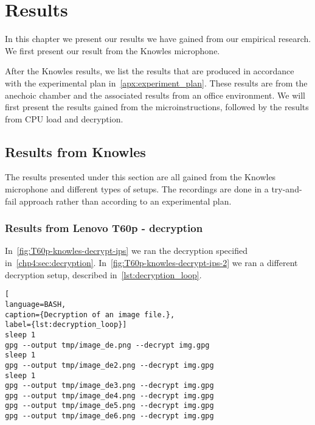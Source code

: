 \chapter{Results}
\label{chp5:results} 
In this chapter we present our results we have gained from our empirical research. 
We first present our result from the Knowles microphone.

After the Knowles results, we list the results that are produced in accordance with the experimental plan in~\autoref{apx:experiment_plan}. 
These results are from the anechoic chamber and the associated results from an office environment.  
We will first present the results gained from the microinstructions, followed by the results from CPU load and decryption. 

\section{Results from Knowles}\label{chp5:sec:knowles_results}
The results presented under this section are all gained from the Knowles microphone and different types of setups.
The recordings are done in a try-and-fail approach rather than according to an experimental plan.

\subsection{Results from Lenovo T60p - decryption}\label{chp5:subsec:t60p_knowles_results_decryption}
In~\autoref{fig:T60p-knowles-decrypt-ips} we ran the decryption specified in~\autoref{chp4:sec:decryption}. 
In~\autoref{fig:T60p-knowles-decrypt-ips-2} we ran a different decryption setup, described in~\autoref{lst:decryption_loop}.

\begin{lstlisting}[
language=BASH, 
caption={Decryption of an image file.}, 
label={lst:decryption_loop}]
sleep 1             
gpg --output tmp/image_de.png --decrypt img.gpg
sleep 1
gpg --output tmp/image_de2.png --decrypt img.gpg
sleep 1
gpg --output tmp/image_de3.png --decrypt img.gpg
gpg --output tmp/image_de4.png --decrypt img.gpg    
gpg --output tmp/image_de5.png --decrypt img.gpg
gpg --output tmp/image_de6.png --decrypt img.gpg
\end{lstlisting}

